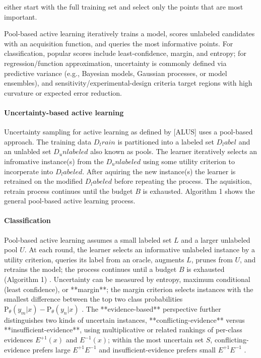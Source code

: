\documentclass[conference]{IEEEtran}
\begin{document}
either start with the full training set and select only the points that are most important.  

Pool-based active learning iteratively trains a model, scores unlabeled candidates with an acquisition function, and queries the most informative points. For classification, popular scores include least-confidence, margin, and entropy; for regression/function approximation, uncertainty is commonly defined via predictive variance (e.g., Bayesian models, Gaussian processes, or model ensembles), and sensitivity/experimental-design criteria target regions with high curvature or expected error reduction. 
\paragraph*{Uncertainty-based active learning}
Uncertainty sampling for active learning as defined by [ALUS] uses a pool-based approach. The training data $D_train$ is partitioned into a labeled set $D_label$ and an unlabled set $D_unlabeled$ also known as pools. The learner iteratively selects an infromative instance(s) from the $D_unlabeled$ using some utility criterion to incorperate into $D_labeled$. After aquiring the new instance(s) the learner is retrained on the modified $D_labeled$ before repeating the process. The aquisition, retrain process continues until the budget $B$ is exhausted. Algorithm 1 shows the general pool-based active learning process. 


\paragraph{Classification}
Pool-based active learning assumes a small labeled set $L$ and a larger unlabeled pool $U$. At each round, the learner selects an informative unlabeled instance by a utility criterion, queries its label from an oracle, augments $L$, prunes from $U$, and retrains the model; the process continues until a budget $B$ is exhausted (Algorithm 1)  . Uncertainty can be measured by entropy, maximum conditional (least confidence), or **margin**; the margin criterion selects instances with the smallest difference between the top two class probabilities $\mathrm{P}_\theta(y_m|x)-\mathrm{P}_\theta(y_n|x)$  . The **evidence-based** perspective further distinguishes two kinds of uncertain instances, **conflicting-evidence** versus **insufficient-evidence**, using multiplicative or related rankings of per-class evidences $E^{+1}(x)$ and $E^{-1}(x)$; within the most uncertain set $S$, conflicting-evidence prefers large $E^{+1}E^{-1}$ and insufficient-evidence prefers small $E^{+1}E^{-1}$  .
\end{document}
